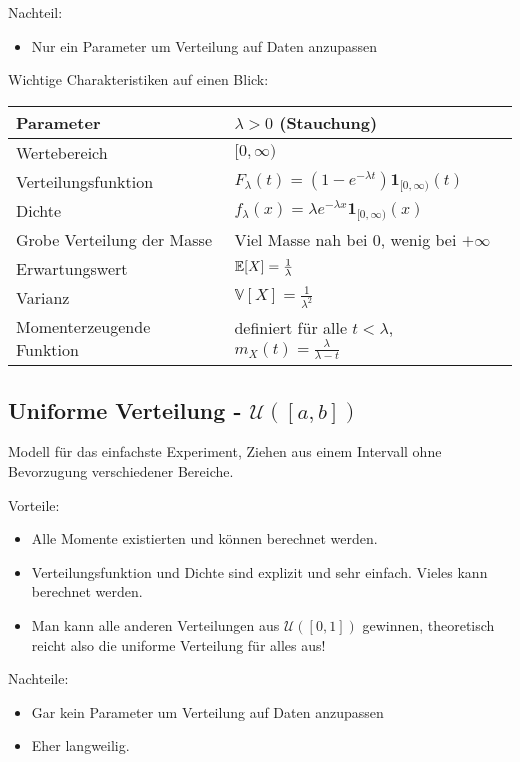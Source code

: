 \documentclass[11pt, a4paper]{book}
\begin{document}
{Nachteil:}
\begin{itemize}
	\item Nur ein Parameter um Verteilung auf Daten anzupassen
\end{itemize}

Wichtige Charakteristiken auf einen Blick:
\begin{center}
\begin{tabular}[h]{|l|l|}
\hline
Parameter& $\lambda>0$ (Stauchung)\\
\hline
Wertebereich & $[0,\infty)$\\
\hline
Verteilungsfunktion & $F_\lambda(t)= (1-e^{-\lambda t})\mathbf 1_{[0,\infty)}(t) $\\
\hline
Dichte & $f_\lambda(x)=\lambda e^{-\lambda x} \mathbf 1_{[0,\infty)}(x)$\\
\hline
Grobe Verteilung der Masse & Viel Masse nah bei $0$, wenig bei $+\infty$\\
\hline
Erwartungswert& $\mathbb{E}[X]=\frac{1}{\lambda}$ \\
\hline
Varianz & $\mathbb V[X]=\frac{1}{\lambda^2} $\\
\hline
Momenterzeugende Funktion& definiert f\"ur alle $t<\lambda$, $m_X(t)=\frac{\lambda}{\lambda-t}$\\
\hline
\end{tabular}

\end{center}


\subsection{Uniforme Verteilung - $\mathcal U([a,b])$}

Modell f\"ur das einfachste Experiment, Ziehen aus einem Intervall ohne Bevorzugung verschiedener Bereiche.\smallskip

{Vorteile:} 
\begin{itemize}
\item Alle Momente existierten und k\"onnen berechnet werden.
\item Verteilungsfunktion und Dichte sind explizit und sehr einfach. Vieles kann berechnet werden.
\item Man kann alle anderen Verteilungen aus $\mathcal U([0,1])$ gewinnen, theoretisch reicht also die uniforme Verteilung f\"ur alles aus!
\end{itemize}

{Nachteile:}
\begin{itemize}
	\item Gar kein Parameter um Verteilung auf Daten anzupassen
	\item Eher langweilig.
\end{itemize}
\end{document}
